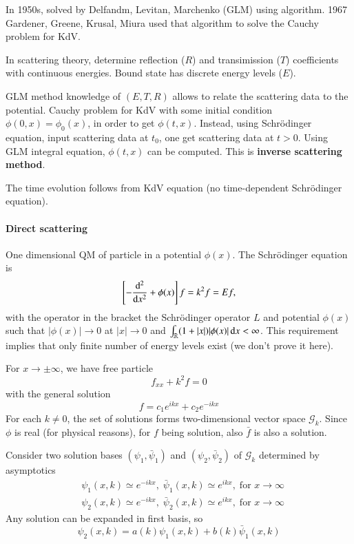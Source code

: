 In 1950s, solved by Delfandm, Levitan, Marchenko (GLM) using algorithm. 1967 Gardener, Greene, Krusal, Miura used that algorithm to solve the Cauchy problem for KdV.

In scattering theory, determine reflection ($R$) and transimission ($T$) coefficients with continuous energies. Bound state has discrete energy levels ($E$).

GLM method knowledge of $(E, T, R)$ allows to relate the scattering data to the potential. Cauchy problem for KdV with some initial condition $\phi(0, x) = \phi_0 (x)$, in order to get $\phi(t, x)$. Instead, using Schrödinger equation, input scattering data at $t_0$, one get scattering data at $t > 0$. Using GLM integral equation, $\phi(t, x)$ can be computed. This is \textbf{inverse scattering method}.

The time evolution follows from KdV equation (no time-dependent Schrödinger equation).

\paragraph{Direct scattering}
One dimensional QM of particle in a potential $\phi(x)$. The Schrödinger equation is 
\begin{equation*}
	\left[ - \dv[2]{x} + \phi(x) \right]  f = k^2 f = E f,
\end{equation*}
with the operator in the bracket the Schrödinger operator $L$ and potential $\phi(x)$ such that $|\phi(x)| \rightarrow 0$ at $|x|\rightarrow 0$ and $\int_{\mathbb{R}} (1 + |x|) |\phi(x)|\dd{x} < \infty$. This requirement implies that only finite number of energy levels exist (we don't prove it here).

For $x \rightarrow \pm \infty$, we have free particle
\begin{equation*}
	f_{x x } + k^2 f =0
\end{equation*}
with the general solution
\begin{equation}
	f = c_1 e^{ikx} + c_2 e^{-ikx}
\end{equation}
For each $k \neq 0$, the set of solutions forms two-dimensional vector space $\mathcal{G}_k$. Since $\phi$ is real (for physical reasons), for $f$ being solution, also $\bar{f}$ is also a solution.

Consider two solution bases $(\psi_1, \bar{\psi}_1)$ and $(\psi_2, \bar{\psi}_2)$ of $\mathcal{G}_k$ determined by asymptotics
\begin{align*}
	&\psi_1 (x, k) \simeq e^{-ikx}, \; \bar{\psi}_1(x,k) \simeq e^{ikx}, \; \text{for } x\rightarrow \infty \\
	&\psi_2 (x, k) \simeq e^{-ikx}, \; \bar{\psi}_2(x,k) \simeq e^{ikx}, \; \text{for } x\rightarrow \infty
\end{align*}
Any solution can be expanded in first basis, so
\begin{equation*}
	\psi_2(x, k) = a(k) \psi_1 (x,k ) + b(k) \bar{\psi}_1(x,k)
\end{equation*}


